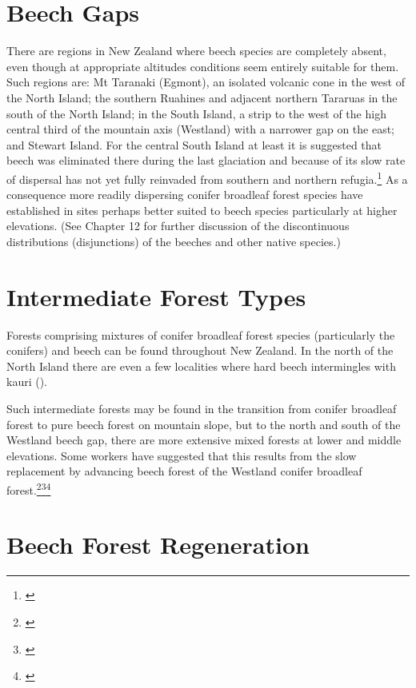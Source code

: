\section{Beech Gaps}

There are regions in New Zealand where beech species are completely absent, even though at appropriate altitudes conditions seem entirely suitable for them.
Such regions are: Mt Taranaki (Egmont), an isolated volcanic cone in the west of the North Island; the southern Ruahines and adjacent northern Tararuas in the south of the North Island; in the South Island, a strip to the west of the high central third of the mountain axis (Westland) with a narrower gap on the east; and Stewart Island.
For the central South Island at least it is suggested that beech was eliminated there during the last glaciation and because of its slow rate of dispersal has not yet fully reinvaded from southern and northern refugia.\footnote{\cite{wardle1965comparison}}
As a consequence more readily dispersing conifer broadleaf forest species have established in sites perhaps better suited to beech species particularly at higher elevations. (See Chapter 12 for further discussion of the discontinuous distributions (disjunctions) of the beeches and other native species.)

\section{Intermediate Forest Types}

Forests comprising mixtures of conifer broadleaf forest species (particularly the conifers) and beech can be found throughout New Zealand.
In the north of the North Island there are even a few localities where hard beech intermingles with kauri ().

Such intermediate forests may be found in the transition from conifer broadleaf forest to pure beech forest on mountain slope, but to the north and south of the Westland beech gap, there are more extensive mixed forests at lower and middle elevations.
Some workers have suggested that this results from the slow replacement by advancing beech forest of the Westland conifer broadleaf forest.\footnote{\cite{holloway1954forests}}\footnote{\cite{wardle1964facets}}\footnote{\cite{wardle1980ecology}}

\section{Beech Forest Regeneration}

